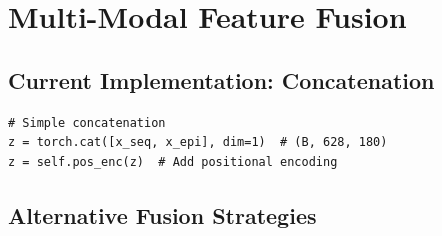 \documentclass[11pt,a4paper]{article}
\begin{document}
\section{Multi-Modal Feature Fusion}

\subsection{Current Implementation: Concatenation}

\begin{verbatim}
# Simple concatenation
z = torch.cat([x_seq, x_epi], dim=1)  # (B, 628, 180)
z = self.pos_enc(z)  # Add positional encoding
\end{verbatim}

\subsection{Alternative Fusion Strategies}
\end{document}
